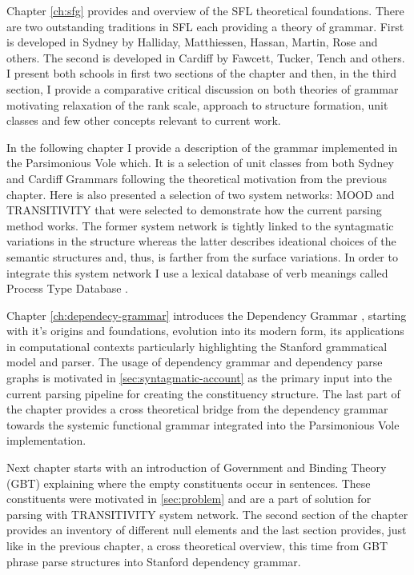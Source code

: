 Chapter \ref{ch:sfg} provides and overview of the SFL theoretical foundations. There are two outstanding traditions in SFL each providing a theory of grammar. First is developed in Sydney by Halliday, Matthiessen, Hassan, Martin, Rose and others. The second is developed in Cardiff by Fawcett, Tucker, Tench and others. I present both schools in first two sections of the chapter and then, in the third section, I provide a comparative critical discussion on both theories of grammar motivating relaxation of the rank scale, approach to structure formation, unit classes and few other concepts relevant to current work. 

In the following chapter I provide a description of the grammar implemented in the Parsimonious Vole which. It is a selection of unit classes from both Sydney and Cardiff Grammars following the theoretical motivation from the previous chapter. Here is also presented a selection of two system networks: MOOD and TRANSITIVITY that were selected to demonstrate how the current parsing method works. The former system network is tightly linked to the syntagmatic variations in the structure whereas the latter describes ideational choices of the semantic structures and, thus, is farther from the surface variations. In order to integrate this system network I use a lexical database of verb meanings called Process Type Database \citet{Neale2002}. 


Chapter \ref{ch:dependecy-grammar} introduces the Dependency Grammar \citeyear{Tesniere59}, starting with it's origins and foundations, evolution into its modern form, its applications in computational contexts particularly highlighting the Stanford grammatical model and parser. The usage of dependency grammar and dependency parse graphs is motivated in \ref{sec:syntagmatic-account} as the primary input into the current parsing pipeline for creating the constituency structure. The last part of the chapter provides a cross theoretical bridge from the dependency grammar towards the systemic functional grammar integrated into the Parsimonious Vole implementation. 

Next chapter starts with an introduction of Government and Binding Theory (GBT) explaining where the empty constituents occur in sentences. These constituents were motivated in \ref{sec:problem} and are a part of solution for parsing with TRANSITIVITY system network. The second section of the chapter provides an inventory of different null elements and the last section provides, just like in the previous chapter, a cross theoretical overview, this time from GBT phrase parse structures into Stanford dependency grammar.

